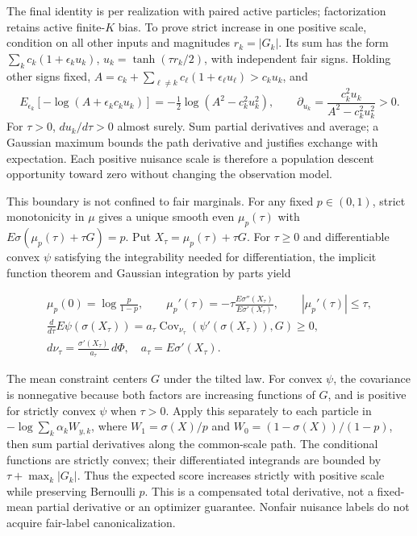 \documentclass{article}
\begin{document}
The final identity is per realization with paired active particles;
factorization retains active finite-\(K\) bias. To prove strict increase
in one positive scale, condition on all other inputs and magnitudes
\(r_k=|G_k|\). Its sum has the form \(\sum_kc_k(1+\epsilon_ku_k)\),
\(u_k=\tanh(\tau r_k/2)\), with independent fair signs. Holding other
signs fixed,
\(A=c_k+\sum_{\ell\ne k}c_\ell(1+\epsilon_\ell u_\ell)>c_ku_k\), and \[
E_{\epsilon_k}[-\log(A+\epsilon_kc_ku_k)]
=-\tfrac12\log(A^2-c_k^2u_k^2),\qquad
\partial_{u_k}=\frac{c_k^2u_k}{A^2-c_k^2u_k^2}>0 .
\] For \(\tau>0\), \(du_k/d\tau>0\) almost surely. Sum partial
derivatives and average; a Gaussian maximum bounds the path derivative
and justifies exchange with expectation. Each positive nuisance scale is
therefore a population descent opportunity toward zero without changing
the observation model.


This boundary is not confined to fair marginals. For any fixed
\(p\in(0,1)\), strict monotonicity in \(\mu\) gives a unique smooth even
\(\mu_p(\tau)\) with \(E\sigma(\mu_p(\tau)+\tau G)=p\). Put
\(X_\tau=\mu_p(\tau)+\tau G\). For \(\tau\ge0\) and differentiable
convex \(\psi\) satisfying the integrability needed for differentiation,
the implicit function theorem and Gaussian integration by parts yield

\[
\begin{gathered}
\mu_p(0)=\log\frac p{1-p},\qquad
\mu_p'(\tau)=-\tau\frac{E\sigma''(X_\tau)}{E\sigma'(X_\tau)},\qquad
|\mu_p'(\tau)|\le\tau,\\
\frac d{d\tau}E\psi(\sigma(X_\tau))
=a_\tau\operatorname{Cov}_{\nu_\tau}(\psi'(\sigma(X_\tau)),G)\ge0,\\
d\nu_\tau=\frac{\sigma'(X_\tau)}{a_\tau}\,d\Phi,\quad a_\tau=E\sigma'(X_\tau).
\end{gathered}
\tag{A.30}
\]

The mean constraint centers \(G\) under the tilted law. For convex
\(\psi\), the covariance is nonnegative because both factors are
increasing functions of \(G\), and is positive for strictly convex
\(\psi\) when \(\tau>0\). Apply this separately to each particle in
\(-\log\sum_k\alpha_kW_{y,k}\), where \(W_1=\sigma(X)/p\) and
\(W_0=(1-\sigma(X))/(1-p)\), then sum partial derivatives along the
common-scale path. The conditional functions are strictly convex; their
differentiated integrands are bounded by \(\tau+\max_k|G_k|\). Thus the
expected score increases strictly with positive scale while preserving
Bernoulli \(p\). This is a compensated total derivative, not a
fixed-mean partial derivative or an optimizer guarantee. Nonfair
nuisance labels do not acquire fair-label canonicalization.
\end{document}
